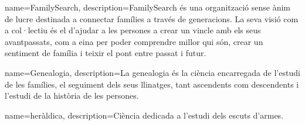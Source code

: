 {
	name=FamilySearch,
	description={FamilySearch és una organització sense ànim de lucre destinada a connectar famílies a través de generacions. La seva visió com a col·lectiu és el d'ajudar a les persones a crear un vincle amb els seus avantpassats, com a eina per poder comprendre millor qui són, crear un sentiment de família i teixir el pont entre passat i futur.}
}

{
	name=Genealogia,
	description={La genealogia és la ciència encarregada de l’estudi de les famílies, el seguiment dels seus llinatges, tant ascendents com descendents i l’estudi de la història de les persones.}
}

{
	name=heràldica,
	description={Ciència dedicada a l'estudi dels escuts d'armes.}
}
